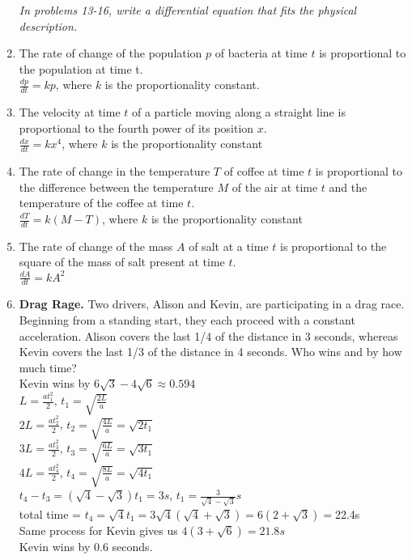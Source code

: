 \documentclass[12pt]{report}
\begin{document}
\begin{enumerate}
				\emph{In problems 13-16, write a differential equation that fits the physical description.}
				\item The rate of change of the population $p$ of bacteria at time $t$ is proportional to the population at time t.\\
				$\frac{dp}{dt}=kp$, where $k$ is the proportionality constant.
				\item The velocity at time $t$ of a particle moving along a straight line is proportional to the fourth power of its position $x$.\\
				$\frac{dx}{dt}=kx^4$, where $k$ is the proportionality constant
				\item The rate of change in the temperature $T$ of coffee at time $t$ is proportional to the difference between the temperature $M$ of the air at time $t$ and the temperature of the coffee at time $t$.\\
				$\frac{dT}{dt}=k(M-T)$, where $k$ is the proportionality constant
				\item The rate of change of the mass $A$ of salt at a time $t$ is proportional to the square of the mass of salt present at time $t$.\\
				$\frac{dA}{dt}=kA^2$
				\item \textbf{Drag Rage.} Two drivers, Alison and Kevin, are participating in a drag race. Beginning from a standing start, they each proceed with a constant acceleration. Alison covers the last 1/4 of the distance in 3 seconds, whereas Kevin covers the last 1/3 of the distance in 4 seconds. Who wins and by how much time?\\
				Kevin wins by $6\sqrt{3}-4\sqrt{6}\approx0.594$\\
				$L=\frac{at_1^2}{2}$, \:$t_1=\sqrt{\frac{2L}{a}}$\\
				$2L=\frac{at_2^2}{2}$, \:$t_2=\sqrt{\frac{4L}{a}}=\sqrt{2t_1}$\\
				$3L=\frac{at_3^2}{2}$, \:$t_3=\sqrt{\frac{6L}{a}}=\sqrt{3t_1}$\\
				$4L=\frac{at_4^2}{2}$, \:$t_4=\sqrt{\frac{8L}{a}}=\sqrt{4t_1}$\\
				$t_4-t_3=(\sqrt{4}-\sqrt{3})t_1=3s$, \:$t_1=\frac{3}{\sqrt{4}-\sqrt{3}}s$\\
				total time = $t_4=\sqrt{4}t_1=3\sqrt{4}(\sqrt{4}+\sqrt{3})=6(2+\sqrt{3})=$22.4s\\
				Same process for Kevin gives us $4(3+\sqrt{6})=21.8s$\\
				Kevin wins by 0.6 seconds.
				
			\end{enumerate}
\end{document}

